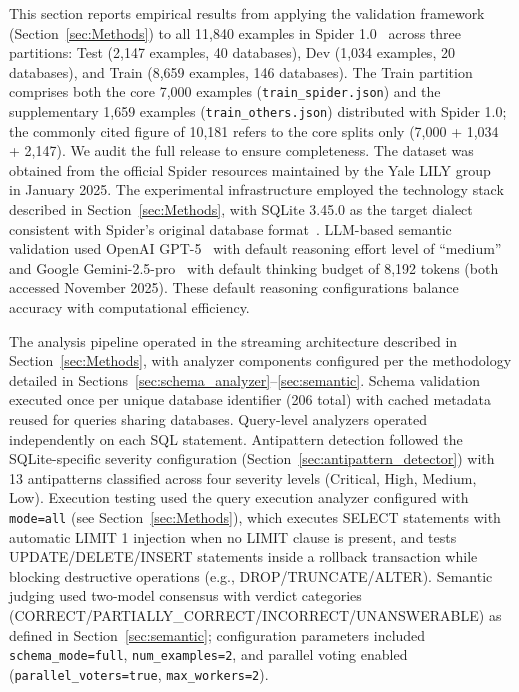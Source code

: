 \documentclass[print]{einformatica}
\begin{document}
This section reports empirical results from applying the validation framework (Section~\ref{sec:Methods}) to all 11,840 examples in Spider 1.0~\cite{yu2018spider} across three partitions: Test (2,147 examples, 40 databases), Dev (1,034 examples, 20 databases), and Train (8,659 examples, 146 databases). The Train partition comprises both the core 7,000 examples (\texttt{train\_spider.json}) and the supplementary 1,659 examples (\texttt{train\_others.json}) distributed with Spider 1.0; the commonly cited figure of 10,181 refers to the core splits only (7,000 + 1,034 + 2,147). We audit the full release to ensure completeness. The dataset was obtained from the official Spider resources maintained by the Yale LILY group~\cite{spiderLeaderboard} in January 2025. The experimental infrastructure employed the technology stack described in Section~\ref{sec:Methods}, with SQLite 3.45.0 as the target dialect consistent with Spider's original database format~\cite{yu2018spider,sqliteForeignKeys}. LLM-based semantic validation used OpenAI GPT-5~\cite{openaiModelsDocs} with default reasoning effort level of ``medium'' and Google Gemini-2.5-pro~\cite{geminiApiDocs} with default thinking budget of 8,192 tokens (both accessed November 2025). These default reasoning configurations balance accuracy with computational efficiency.

The analysis pipeline operated in the streaming architecture described in Section~\ref{sec:Methods}, with analyzer components configured per the methodology detailed in Sections~\ref{sec:schema_analyzer}--\ref{sec:semantic}. Schema validation executed once per unique database identifier (206 total) with cached metadata reused for queries sharing databases. Query-level analyzers operated independently on each SQL statement. Antipattern detection followed the SQLite-specific severity configuration (Section~\ref{sec:antipattern_detector}) with 13 antipatterns classified across four severity levels (Critical, High, Medium, Low). Execution testing used the query execution analyzer configured with \texttt{mode=all} (see Section~\ref{sec:Methods}), which executes SELECT statements with automatic LIMIT 1 injection when no LIMIT clause is present, and tests UPDATE/DELETE/INSERT statements inside a rollback transaction while blocking destructive operations (e.g., DROP/\allowbreak TRUNCATE/\allowbreak ALTER). Semantic judging used two-model consensus with verdict categories (CORRECT/\allowbreak PARTIALLY\_CORRECT/\allowbreak INCORRECT/\allowbreak UNANSWERABLE) as defined in Section~\ref{sec:semantic}; configuration parameters included \texttt{schema\_mode=full}, \texttt{num\_examples=2}, and parallel voting enabled (\texttt{parallel\_voters=true}, \texttt{max\_workers=2}).
\end{document}
